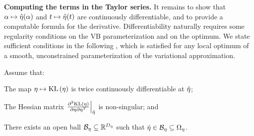\noindent \textbf{Computing the terms in the Taylor series.}  It remains to show
that $\alpha \mapsto \hat\eta(\alpha)$ and $t \mapsto \hat\eta(t)$ are
continuously differentiable, and to provide a computable formula for the
derivative.
%
Differentiability naturally requires some regularity conditions on the VB
parameterization and on the optimum.  We state sufficient conditions in the
following , which is satisfied for any local optimum of a
smooth, unconstrained parameterization of the variational approximation.

\begin{assu}
%
Assume that:
%
\begin{enumerate*}[label=(\arabic*)]
%
    \item {} The map $\eta \mapsto \mathrm{KL}\left(\eta\right)$ is twice
    continuously differentiable at $\hat\eta$;

    \item{} The Hessian matrix $\left.\frac{\partial^2 \mathrm{KL}\left(\eta\right)}{\partial \eta \partial \eta^T}\right\vert_{\hat\eta}$ is non-singular; and

    \item {} There exists an open ball $\mathcal{B}_\eta
    \subseteq \mathbb{R}^{D_{\eta}}$ such that $\hat\eta \in \mathcal{B}_\eta \subseteq
    \Omega_{\eta}$.
%
\end{enumerate*}
%
\end{assu}


%

